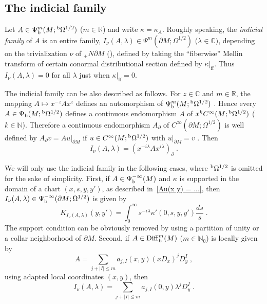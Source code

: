 \documentclass{memo-l}
\theoremstyle{plain}
\theoremstyle{definition}
\theoremstyle{remark}
\newcommand{\C}{\mathbb{C}}
\newcommand{\N}{\mathbb{N}}
\newcommand{\R}{\mathbb{R}}
\newcommand{\Diff}{\operatorname{Diff}}
\newcommand{\ff}{\operatorname{ff}}
\newcommand{\bOmega}{{}^{\text{\rm b}}\Omega}
\newcommand{\Psib}{\Psi_{\text{\rm b}}}
\newcommand{\Diffb}{\Diff_{\text{\rm b}}}
\numberwithin{section}{chapter}
\numberwithin{equation}{section}%
\begin{document}
\subsection{The indicial family}\label{s: indicial}

Let $A\in\Psib^m(M;\bOmega^{1/2})$ ($m\in\R$) and write $\kappa=\kappa_A$. Roughly speaking, the \emph{indicial family}  of $A$ is an entire family, $I_\nu(A,\lambda)\in\Psi^m(\partial M;\Omega^{1/2})$ ($\lambda\in\C)$,  depending on the trivialization $\nu$ of ${}_+N\partial M$ (), defined by taking the ``fiberwise'' Mellin transform of certain conormal distributional section defined by $\kappa|_{\ff}$. Thus $I_\nu(A,\lambda)=0$ for all $\lambda$ just when $\kappa|_{\ff}=0$.

The indicial family can be also described as follows. For $z\in\C$ and $m\in\R$, the mapping $A\mapsto x^{-z}Ax^z$ defines an automorphism of $\Psib^m(M;\bOmega^{1/2})$ \cite[Proposition~5.7]{Melrose1993}. Hence every $A\in\Psib(M;\bOmega^{1/2})$ defines a continuous endomorphism $A$ of $x^kC^\infty(M;\bOmega^{1/2})$ ($k\in\N$). Therefore a continuous endomorphism $A_\partial$ of $C^\infty(\partial M;\Omega^{1/2})$ is well defined by $A_\partial v=Au|_{\partial M}$ if $u\in C^\infty(M;\bOmega^{1/2})$ with $u|_{\partial M}=v$ \cite[Eq.~(5.31)]{Melrose1993}. Then \cite[Proposition~5.8]{Melrose1993}
\begin{equation}\label{I_nu(A lambda) = (x^-i lambda A x^i lambda)_partial}
I_\nu(A,\lambda)=(x^{-i\lambda}Ax^{i\lambda})_\partial\;.
\end{equation}

We will only use the indicial family in the following cases, where $\bOmega^{1/2}$ is omitted for the sake of simplicity. First, if $A\in\Psib^{-\infty}(M)$ and $\kappa$ is supported in the domain of a chart $(x,s,y,y')$, as described in~\eqref{Au(x y) = ...}, then $I_\nu(A,\lambda)\in\Psib^{-\infty}(\partial M;\Omega^{1/2})$ is given by
	\begin{equation}\label{K_I_nu(A lambda)(y y')}
		K_{I_\nu(A,\lambda)}(y,y')=\int_0^{\infty}s^{-i\lambda}\kappa'(0,s,y,y')\frac{ds}{s}\;.
	\end{equation}
The support condition can be obviously removed by using a partition of unity or a collar neighborhood of $\partial M$. Second, if $A\in\Diffb^m(M)$ ($m\in\N_0$) is locally given by
	\[
		A=\sum_{j+|I|\le m}a_{j,I}(x,y)(xD_x)^jD^I_y\;,
	\]
using adapted local coordinates $(x,y)$, then
	\begin{equation}\label{I_nu(A lambda) for A in Diffb^m(M)}
		I_\nu(A,\lambda)=\sum_{j+|I|\le m}a_{j,I}(0,y)\lambda^jD^I_y\;.
	\end{equation}
\end{document}
